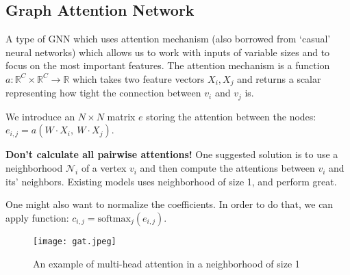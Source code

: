 \subsection{Graph Attention Network}
\begin{frame}[allowframebreaks]{\subsecname}
   A type of GNN which uses attention mechanism (also borrowed from `casual' neural networks) which allows us to work with inputs of variable sizes and to focus on the most important features.
   The attention mechanism is a function $a: \mathbb{R}^C \times \mathbb{R}^C \rightarrow \mathbb{R}$ which takes two feature vectors $X_i, X_j$ and returns a scalar representing how tight the connection between $v_i$ and $v_j$ is.
   
   \framebreak

   We introduce an $N \times N$ matrix $e$ storing the attention between the nodes: $e_{i, j} = a\left( W \cdot X_i,\ W \cdot X_j \right)$.

   \textbf{Don't calculate all pairwise attentions!}
   One suggested solution is to use a neighborhood $\mathcal{N}_i$ of a vertex $v_i$ and then compute the attentions between $v_i$ and its' neighbors.
   Existing models uses neighborhood of size 1, and perform great.

   One might also want to normalize the coefficients.
   In order to do that, we can apply  function: $c_{i, j} = \text{softmax}_j \left( e_{i, j} \right)$.

   \begin{figure}[h]
       \centering
       \texttt{[image: gat.jpeg]}
       \caption{An example of multi-head attention in a neighborhood of size 1}
   \end{figure}
\end{frame}


